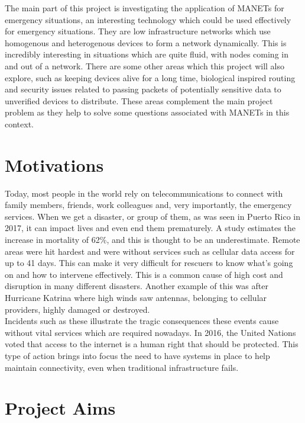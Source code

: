 \documentclass{report}
\begin{document}
The main part of this project is investigating the application of MANETs for emergency situations, an interesting technology which could be used
effectively for emergency situations. They are low infrastructure networks which use homogenous and heterogenous devices to form a 
network dynamically. This is incredibly interesting in situations which are quite fluid, with nodes coming in and out of a network\cite{sun2001mobile}. 
There are some other areas which this project will also explore, such as keeping devices alive for a long time, biological 
inspired routing and security issues related to passing packets of potentially sensitive data to unverified devices to distribute. These areas complement 
the main project problem as they help to solve some questions associated with MANETs in this context.


\section*{Motivations}
Today, most people in the world rely on telecommunications to connect with family members, friends, 
work colleagues and, very importantly, the emergency services. When we get a disaster, or group of them, as was 
seen in Puerto Rico in 2017, it can impact lives and even end them prematurely. A study estimates the increase in 
mortality of 62\%\cite{kishore2018mortality}, and this is thought to be an underestimate. Remote areas were hit hardest and were without services 
such as cellular data access for up to 41 days. This can make it very difficult for rescuers to know what's going on and how to intervene 
effectively. This is a common cause of high cost and disruption in many different disasters. 
Another example of this was after Hurricane Katrina\cite{banipal2006strategic} where high winds saw antennas, belonging to cellular 
providers, highly damaged or destroyed. 
\bigskip\\
Incidents such as these illustrate the tragic consequences these events cause without vital services which are required nowadays. 
In 2016, the United Nations voted that access to the internet is a human right that should be protected\cite{UNResolutionJune2016}. 
This type of action brings into focus the need to have systems in place to help maintain connectivity, even when traditional infrastructure 
fails. 

\section*{Project Aims}
\end{document}
